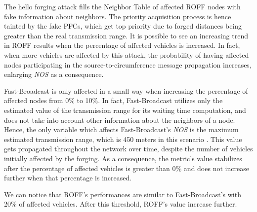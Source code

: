 			The hello forging attack fills the Neighbor Table of affected ROFF nodes with fake information about neighbors. The priority acquisition process is hence tainted by the fake PFCs, which get top priority due to forged distances being greater than the real transmission range. It is possible to see an increasing trend in ROFF results when the percentage of affected vehicles is increased. In fact, when more vehicles are affected by this attack, the probability of having affected nodes participating in the source-to-circumference message propagation increases, enlarging \textit{NOS} as a consequence.
			
			
			Fast-Broadcast is only affected in a small way when increasing the percentage of affected nodes from 0\% to 10\%. In fact, Fast-Broadcast utilizes only the estimated value of the transmission range for its waiting time computation, and does not take into account other information about the neighbors of a node. Hence, the only variable which affects Fast-Broadcast's \textit{NOS} is the maximum estimated transmission range, which is 450 meters in this scenario . This value gets propagated throughout the network over time, despite the number of vehicles initially affected by the forging. As a consequence, the metric's value stabilizes after the percentage of affected vehicles is greater than 0\% and does not increase further when that percentage is increased.
			
			
			We can notice that ROFF's performances are similar to Fast-Broadcast's with 20\% of affected vehicles. After this threshold, ROFF's value increase further.
		
